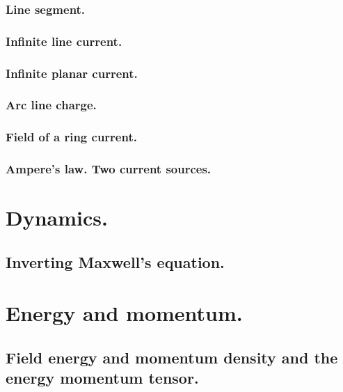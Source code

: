          \subsubsection{Line segment.}
            
         \subsubsection{Infinite line current.}
            
            
         \subsubsection{Infinite planar current.}
            
            
         \subsubsection{Arc line charge.}
            
         \subsubsection{Field of a ring current.}
            
         \subsubsection{Ampere's law.  Two current sources.}
            
      \section{Dynamics.}
         \subsection{Inverting Maxwell's equation.}
            
      \section{Energy and momentum.}
         \subsection{Field energy and momentum density and the energy momentum tensor.}
            
